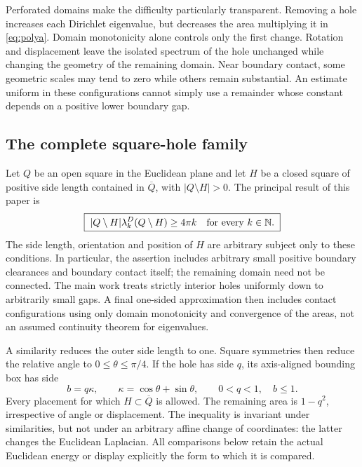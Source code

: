 \documentclass[11pt,reqno]{amsart}
\numberwithin{equation}{section}
\newcommand{\N}{\mathbb N}
\begin{document}
Perforated domains make the difficulty particularly transparent.
Removing a hole increases each Dirichlet eigenvalue, but decreases
the area multiplying it in \eqref{eq:polya}. Domain monotonicity
alone controls only the first change. Rotation and displacement
leave the isolated spectrum of the hole unchanged while changing
the geometry of the remaining domain. Near boundary contact, some
geometric scales may tend to zero while others remain substantial.
An estimate uniform in these configurations cannot simply use a
remainder whose constant depends on a positive lower boundary gap.

\subsection*{The complete square-hole family}

Let $Q$ be an open square in the Euclidean plane and let $H$ be
a closed square of positive side length contained in $\overline Q$,
with $|Q\setminus H|>0$.
The principal result of this paper is
\begin{equation}\label{eq:main-frame}
 \boxed{\;|Q\setminus H|\lambda_k^D(Q\setminus H)
            \ge4\pi k\quad\hbox{for every }k\in\N.\;}
\end{equation}
The side length, orientation and position of $H$ are arbitrary
subject only to these conditions. In particular, the assertion
includes arbitrary small positive boundary clearances and boundary
contact itself; the remaining domain need not be connected.
The main work treats strictly interior holes uniformly down to
arbitrarily small gaps. A final one-sided approximation then includes
contact configurations using only domain monotonicity and convergence
of the areas, not an assumed continuity theorem for eigenvalues.

A similarity reduces the outer side length to one. Square symmetries
then reduce the relative angle to $0\le\theta\le\pi/4$. If the hole
has side $q$, its axis-aligned bounding box has side
\begin{equation}\label{eq:geometry-normalization}
 b=q\kappa,\qquad \kappa=\cos\theta+\sin\theta,
 \qquad 0<q<1,\quad b\le1.
\end{equation}
Every placement for which $H\subset\overline Q$ is allowed.
The remaining area is $1-q^2$, irrespective of
angle or displacement. The inequality is invariant under
similarities, but not under an arbitrary affine change of
coordinates: the latter changes the Euclidean Laplacian. All
comparisons below retain the actual Euclidean energy or display
explicitly the form to which it is compared.
\end{document}
